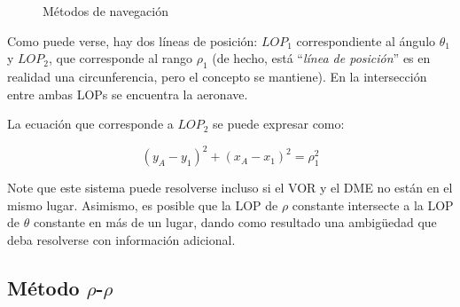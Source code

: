 \begin{figure}[!h]
  \centering
  \caption{M\'etodos de navegaci\'on}
\end{figure}


Como puede verse, hay dos l\'ineas de posici\'on: $LOP_1$ correspondiente al \'angulo $\theta_1$ y $LOP_2$, que corresponde al rango $\rho_1$ (de hecho, est\'a ``\textit{l\'inea de posici\'on}'' es en realidad una circunferencia, pero el concepto se mantiene). En la intersecci\'on entre ambas LOPs se encuentra la aeronave.

La ecuaci\'on que corresponde a $LOP_2$ se puede expresar como:


\[ (y_A - y_1)^2 + (x_A - x_1)^2 = \rho_{1}^{2} \]

Note que este sistema puede resolverse incluso si el VOR y el DME no est\'an en el mismo lugar. Asimismo, es posible que la LOP de $\rho$ constante intersecte a la LOP de $\theta$ constante en m\'as de un lugar, dando como resultado una ambigüedad que deba resolverse con informaci\'on adicional. 


\subsection{M\'etodo $\rho$-$\rho$}

